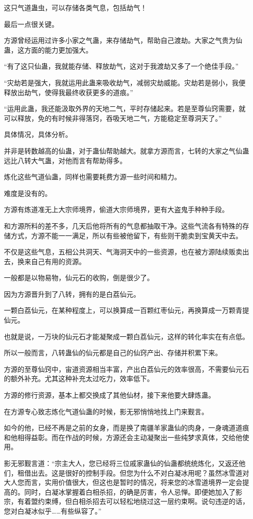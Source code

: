 \begin{this_body}
这只气道蛊虫，可以存储各类气息，包括劫气！

最后一点很关键。

方源曾经运用过许多小家之气蛊，来存储劫气，帮助自己渡劫。大家之气贵为仙蛊，这方面的能力更加强大。

“有了这只仙蛊，我就能存储、释放劫气，这对于我渡劫又多了一个绝佳手段。”

“灾劫若是强大，我就运用此蛊来吸收劫气，减弱灾劫威能。灾劫若是弱小，我便释放出劫气，使得我最终收获更多的道痕。”

“运用此蛊，我还能汲取外界的天地二气，平时存储起来。若是至尊仙窍需要，就可以释放，免的有时候非得落窍，吞吸天地二气，方能稳定至尊洞天了。”

具体情况，具体分析。

并非是转数越高的仙蛊，对于蛊仙帮助越大。就拿方源而言，七转的大家之气仙蛊远比八转大气蛊，对他而言有帮助得多。

炼化这些气道仙蛊，同样也需要耗费方源一些时间和精力。

难度是没有的。

方源有炼道准无上大宗师境界，偷道大宗师境界，更有大盗鬼手种种手段。

和方源所料的差不多，几天后他将所有的气息都抽取干净。这些气流各有特殊的存储方式，方源不能一一满足，所以有些被他留下，有些则干脆卖到宝黄天中去。

不仅是这些气息，五相公共洞天、气海洞天中的一些资源，也在被方源陆续贩卖出去，换来自己有用的资源。

一般都是以物易物，仙元石的收购，倒是很少了。

因为方源晋升到了八转，拥有的是白荔仙元。

一颗白荔仙元，在某种程度上，可以换算成一百颗红枣仙元，再换算成一万颗青提仙元。

也就是说，一万块的仙元石才能凝聚成一颗白荔仙元，这样的转化率实在有点低。

所以一般而言，八转蛊仙的仙元都是自己的仙窍产出、存储并积累下来。

方源的至尊仙窍中，宙道资源相当丰富，产出白荔仙元的效率很高，不需要仙元石的额外补充。尤其这种补充太过吃力，效率低下。

方源的修行资源，基本上都交换成了其他仙材，接下来他要大肆炼蛊。

在方源专心致志炼化气道仙蛊的时候，影无邪悄悄地找上门来觐言。

如今的他，已经不再是之前的女身，而是换了南疆羊家蛊仙的肉身，一身魂道道痕和他相得益彰。而在作战的时候，方源还会主动凝聚出一些纯梦求真体，交给他使用。

影无邪觐言道：“宗主大人，您已经将三位戚家蛊仙的仙蛊都统统炼化，又返还他们，租借出去。这是很好的控制手段。但您为什么不对白凝冰用呢？虽然冰雪道对大人您而言，实用价值很大，但这也是暂时的情况，将来您的冰雪道境界一定会提高的。同时，白凝冰掌握着白相杀招，的确是厉害，令人忌惮。即便她加入了影宗，有着盟约束缚，但白相杀招去可以轻松地绕过这一层约束啊。说句违逆的话，您对白凝冰似乎……有些纵容了。”


\end{this_body}
